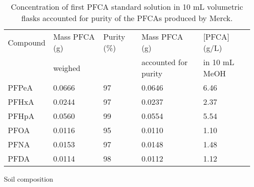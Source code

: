 \begin{table}[ht]
\centering
\caption{Concentration of first PFCA standard solution in 10 mL volumetric flasks accounted for purity of the PFCAs produced by Merck.}
\label{appTab:purityMass}
\begin{tabular}{lllll}
\toprule
Compound & Mass PFCA (g) & Purity (\%) & Mass PFCA (g) & {[}PFCA{]} (g/L) \\ 
& weighed & & accounted for purity & in   10 mL MeOH \\ \midrule
PFPeA & 0.0666 & 97 & 0.0646 & 6.46 \\
PFHxA & 0.0244 & 97 & 0.0237 & 2.37 \\
PFHpA & 0.0560 & 99 & 0.0554 & 5.54 \\
PFOA & 0.0116 & 95 & 0.0110 & 1.10 \\
PFNA & 0.0153 & 97 & 0.0148 & 1.48 \\
PFDA & 0.0114 & 98 & 0.0112 & 1.12 \\ \bottomrule
\end{tabular}
\end{table}

\begin{table}
\centering
\caption{Expected concentration of PFCA standards based on weight of native PFCA and dilution calculations versus analytical concentration by LC-MS/MS.}
\label{appTab:expConc}
\end{table}


Soil composition